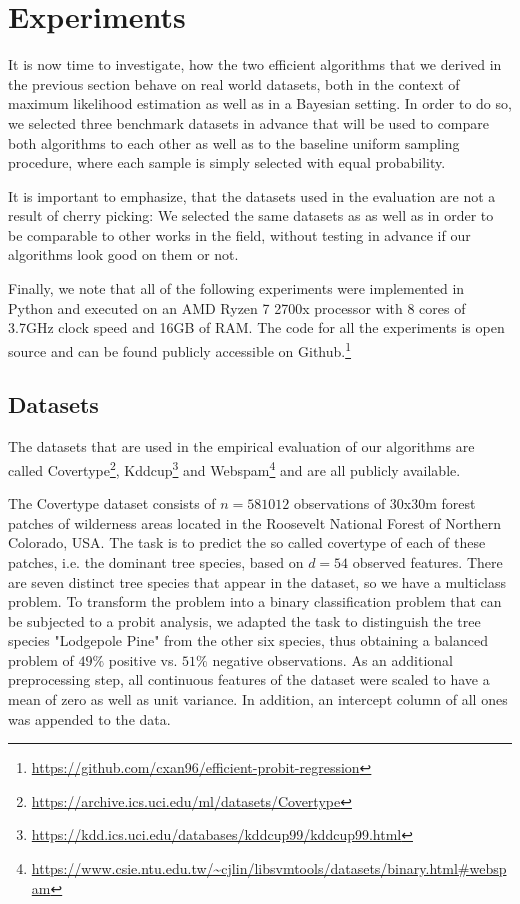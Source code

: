 \section{Experiments}

It is now time to investigate, how the two efficient algorithms that
we derived in the previous section behave on real world datasets,
both in the context of maximum likelihood estimation as well as
in a Bayesian setting.
In order to do so, we selected three benchmark datasets in advance
that will be used to compare both algorithms to each other as
well as to the baseline uniform sampling procedure, where each
sample is simply selected with equal probability.

It is important to emphasize, that the datasets used in the evaluation
are not a result of cherry picking: We selected the same datasets
as \cite{on-coresets} as well as \cite{coresets-strengthened}
in order to be comparable to other works in the field, without
testing in advance if our algorithms look good on them or not.

Finally, we note that all of the following experiments were
implemented in Python and executed on an
AMD Ryzen 7 2700x processor with 8 cores of 3.7GHz clock speed
and 16GB of RAM.
The code for all the experiments is open source and can be
found publicly accessible on Github.\footnote{
    \url{https://github.com/cxan96/efficient-probit-regression}
}

\subsection{Datasets}

The datasets that are used in the empirical evaluation of our
algorithms are called Covertype\footnote{
    \url{https://archive.ics.uci.edu/ml/datasets/Covertype}
}, Kddcup\footnote{
    \url{https://kdd.ics.uci.edu/databases/kddcup99/kddcup99.html}
} and Webspam\footnote{
    \url{https://www.csie.ntu.edu.tw/\~cjlin/libsvmtools/datasets/binary.html\#webspam}
} and are
all publicly available.

The Covertype dataset consists of $n=581012$ observations of 30x30m
forest patches of wilderness areas located in the
Roosevelt National Forest of Northern Colorado, USA.
The task is to predict the so called covertype of each of these
patches, i.e. the dominant tree species, based on $d=54$
observed features. There are seven distinct tree species that
appear in the dataset, so we have a multiclass problem. To transform
the problem into a binary classification problem that can be
subjected to a probit analysis, we adapted the task to distinguish the
tree species "Lodgepole Pine" from the other six species, thus
obtaining a balanced problem of $49\%$ positive vs. $51\%$ negative
observations.
As an additional preprocessing step, all continuous features of the
dataset were scaled to have a mean of zero as well as unit variance.
In addition, an intercept column of all ones was appended to the data.

